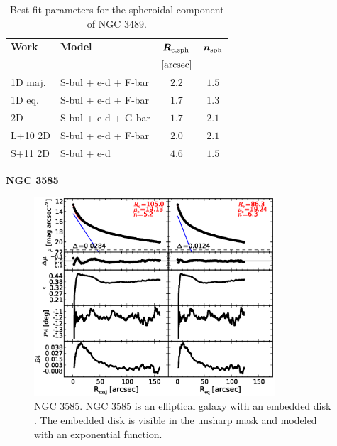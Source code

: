 \documentclass[preprint2]{emulateapj}
\newcommand{\fitfigurewidth}{0.8\textwidth}
\begin{document}
  \begin{table}[h]
  \small
  \caption{Best-fit parameters for the spheroidal component of NGC 3489.}
  \begin{center}
  \begin{tabular}{llcc}
  \hline
  {\bf Work} & {\bf Model}   & $\bm R_{\rm e,sph}$    & $\bm n_{\rm sph}$ \\
    &  &  $[\rm arcsec]$ & \\
  \hline
  1D maj. & S-bul + e-d + F-bar & $2.2$  &  $1.5$ \\
  1D eq.  & S-bul + e-d + F-bar & $1.7$  &  $1.3$ \\
  2D      & S-bul + e-d + G-bar & $1.7$  &  $2.1$ \\
  \hline
  L+10 2D         & S-bul + e-d + F-bar & $2.0$  &  $2.1$ \\
  S+11 2D         & S-bul + e-d & $4.6$  &  $1.5$ \\
  \hline
  \end{tabular}
  \end{center}
  \label{tab:n3489}
  \end{table}


  \clearpage\newpage\noindent

  {\bf NGC 3585 \\}

  \begin{figure}[h]
  \begin{center}
  \includegraphics[width=\fitfigurewidth]{images/n3585_1Dfit.eps}
  \caption{NGC 3585. 
  NGC 3585 is an elliptical galaxy with an embedded disk \citep{scorzabender1995}. 
  The embedded disk is visible in the unsharp mask and modeled with an exponential function. }
  \end{center}
  \end{figure}
\end{document}
